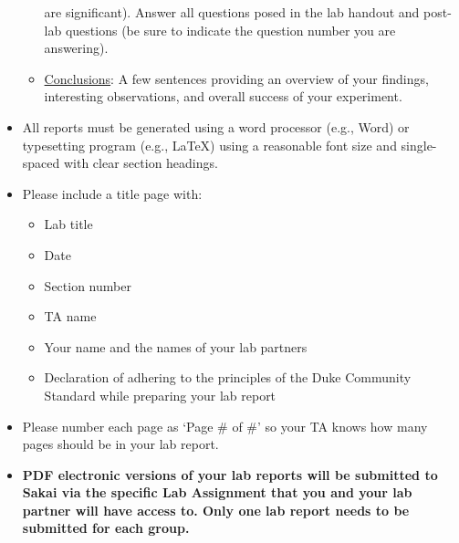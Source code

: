 \begin{itemize}
\begin{itemize}
            are significant).  Answer all questions posed in the lab handout
            and post-lab questions (be sure to indicate the question number you
            are answering).  
        \item \underline{Conclusions}: A few sentences providing an overview of
            your findings, interesting observations, and overall success of
            your experiment.
    \end{itemize}
    \item All reports must be generated using a word processor (e.g., Word) or
        typesetting program (e.g., \LaTeX) using a reasonable font size and
        single-spaced with clear section headings.
    \item Please include a title page with:
        \begin{itemize}
            \item Lab title
            \item Date
            \item Section number
            \item TA name
            \item Your name and the names of your lab partners
            \item Declaration of adhering to the principles of the Duke Community Standard while preparing your lab report
        \end{itemize}
    \item Please number each page as `Page \# of \#' so your TA knows how many
        pages should be in your lab report.
    \item {\bf PDF electronic versions of your lab reports will be submitted to
            Sakai via the specific Lab Assignment that you and your lab partner
            will have access to.  Only one lab report needs to be submitted for
            each group.}
\end{itemize}
